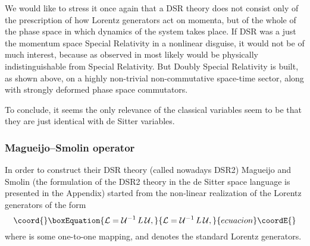 \documentclass  [12pt] {article}
\begin{document}
We would like to stress it once again that a DSR theory does not consist only
of the prescription of how Lorentz generators act on momenta, but of the whole
of the phase space in which dynamics of the system takes place. If DSR was a
just the momentum space Special Relativity in a nonlinear disguise, it would
not be of much interest, because as observed in \cite{lunoDSR} most likely
would be physically indistinguishable from Special Relativity. But Doubly
Special Relativity is built, as shown above, on a highly non-trivial
non-commutative space-time sector, along with strongly deformed phase space
commutators.

To conclude, it seems the only relevance of the classical variables seem to be
that they are just identical with de Sitter variables.

\subsubsection*{Magueijo--Smolin operator}


In order to construct their DSR theory (called nowadays DSR2) Magueijo and
Smolin \cite{Magueijo:2001cr} (the formulation of the DSR2 theory in the de
Sitter space language is presented in the Appendix) started from the non-linear
realization of the Lorentz generators \coordHE{} of the form
\begin{equation}\coord{}\boxEquation{\label{31x}
{\cal L} = {\cal U}^{-1}\, L \, {\cal U},
}{{\cal L} = {\cal U}^{-1}\, L \, {\cal U},
}{ecuacion}\coordE{}\end{equation}
where \coordHE{} is some one-to-one mapping, and \coordHE{} denotes the standard
Lorentz generators.
\end{document}
